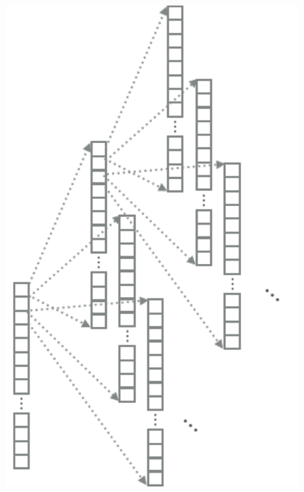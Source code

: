 \documentclass{report}
\begin{document}
\begin{figure}[t]
    \centering
    \begin{minipage}{0.48\textwidth}
        \centering
        \includegraphics[width=0.98\columnwidth]{figures/searchspace.pdf}
    \end{minipage}
    \hfill
    \begin{minipage}{0.48\textwidth}
        \centering

\end{minipage}
\end{figure}
\end{document}
